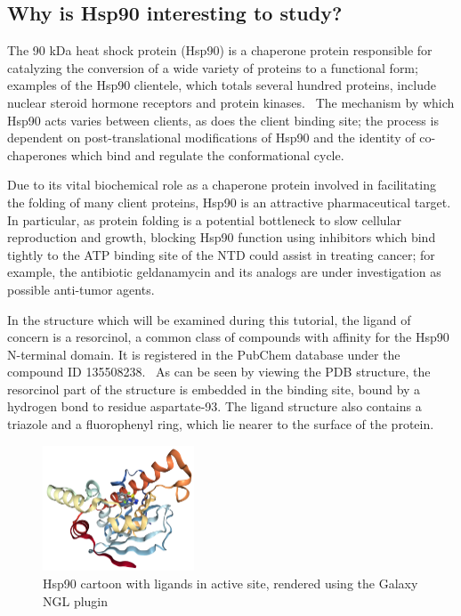 \documentclass[twocolumn]{bmcart}%
\begin{document}
\subsection*{Why is Hsp90 interesting to
study?}\label{why-is-hsp90-interesting-to-study}

The 90 kDa heat shock protein (Hsp90) is a chaperone protein responsible
for catalyzing the conversion of a wide variety of proteins to a
functional form; examples of the Hsp90 clientele, which totals several
hundred proteins, include nuclear steroid hormone receptors and protein
kinases.~\cite{Pearl2006} The mechanism by which Hsp90 acts varies between clients, as
does the client binding site; the process is dependent on
post-translational modifications of Hsp90 and the identity of
co-chaperones which bind and regulate the conformational cycle.~\cite{Schopf2017}

Due to its vital biochemical role as a chaperone protein involved in
facilitating the folding of many client proteins, Hsp90 is an attractive
pharmaceutical target. In particular, as protein folding is a potential
bottleneck to slow cellular reproduction and growth, blocking Hsp90
function using inhibitors which bind tightly to the ATP binding site of the NTD
could assist in treating cancer; for example, the antibiotic
geldanamycin and its analogs are under investigation as possible
anti-tumor agents.~\cite{Stebbins1997,Hermane2019}

In the structure which will be examined during this tutorial, the ligand of concern is a resorcinol, a common class of compounds with affinity for the Hsp90 N-terminal domain. It is registered in the PubChem database under the compound ID 135508238.~\cite{ligand_resorcinol} As can be seen by viewing the PDB structure, the resorcinol part of the structure is embedded in the binding site, bound by a hydrogen bond to residue aspartate-93. The ligand structure also contains a triazole and a fluorophenyl ring, which lie nearer to the surface of the protein.

\begin{figure}[ht!]
  \includegraphics[width=0.4\textwidth]{hsp90lig}
    \caption{
    Hsp90 cartoon with ligands in active site, rendered using the Galaxy NGL plugin~\cite{Rose2018ngl}}
\label{fig:Hsp90}
 \end{figure}
\end{document}
